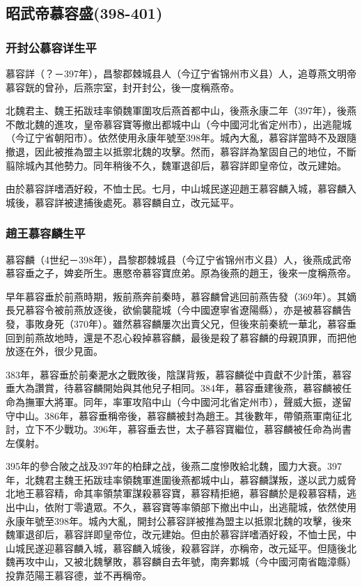 
\subsection{昭武帝慕容盛\tiny(398-401)}

\subsubsection{开封公慕容详生平}

慕容詳（？－397年），昌黎郡棘城县人（今辽宁省锦州市义县）人，追尊燕文明帝慕容皝的曾孙，后燕宗室，封开封公，後一度稱燕帝。

北魏君主、魏王拓跋珪率領魏軍圍攻后燕首都中山，後燕永康二年（397年），後燕不敵北魏的進攻，皇帝慕容寶等撤出都城中山（今中國河北省定州市），出逃龍城（今辽宁省朝阳市）。依然使用永康年號至398年。城內大亂，慕容詳當時不及跟隨撤退，因此被推為盟主以抵禦北魏的攻擊。然而，慕容詳為鞏固自己的地位，不斷翦除城內其他勢力。同年稍後不久，魏軍退卻后，慕容詳即皇帝位，改元建始。

由於慕容詳嗜酒好殺，不恤士民。七月，中山城民遂迎趙王慕容麟入城，慕容麟入城後，慕容詳被逮捕後處死。慕容麟自立，改元延平。

\subsubsection{趙王慕容麟生平}

慕容麟（4世纪－398年），昌黎郡棘城县（今辽宁省锦州市义县）人，後燕成武帝慕容垂之子，婢妾所生。惠愍帝慕容寶庶弟。原為後燕的趙王，後來一度稱燕帝。

早年慕容垂於前燕時期，叛前燕奔前秦時，慕容麟曾逃回前燕告發（369年）。其嫡長兄慕容令被前燕放逐後，欲偷襲龍城（今中國遼寧省遼陽縣），亦是被慕容麟告發，事敗身死（370年）。雖然慕容麟屢次出賣父兄，但後來前秦統一華北，慕容垂回到前燕故地時，還是不忍心殺掉慕容麟，最後是殺了慕容麟的母親頂罪，而把他放逐在外，很少見面。

383年，慕容垂於前秦淝水之戰敗後，陰謀背叛，慕容麟從中貢獻不少計策，慕容垂大為讚賞，待慕容麟開始與其他兒子相同。384年，慕容垂建後燕，慕容麟被任命為撫軍大將軍。同年，率軍攻陷中山（今中國河北省定州市），聲威大振，遂留守中山。386年，慕容垂稱帝後，慕容麟被封為趙王。其後數年，帶領燕軍南征北討，立下不少戰功。396年，慕容垂去世，太子慕容寶繼位，慕容麟被任命為尚書左僕射。

395年的參合陂之战及397年的柏肆之战，後燕二度慘敗給北魏，國力大衰。397年，北魏君主魏王拓跋珪率領魏軍進圍後燕都城中山，慕容麟謀叛，遂以武力威脅北地王慕容精，命其率領禁軍謀殺慕容寶，慕容精拒絕，慕容麟於是殺慕容精，逃出中山，依附丁零遺眾。不久，慕容寶等率領部下撤出中山，出逃龍城，依然使用永康年號至398年。城內大亂，開封公慕容詳被推為盟主以抵禦北魏的攻擊，後來魏軍退卻后，慕容詳即皇帝位，改元建始。但由於慕容詳嗜酒好殺，不恤士民，中山城民遂迎慕容麟入城，慕容麟入城後，殺慕容詳，亦稱帝，改元延平。但隨後北魏再攻中山，又被北魏擊敗，慕容麟自去年號，南奔鄴城（今中國河南省臨漳縣）投靠范陽王慕容德，並不再稱帝。

